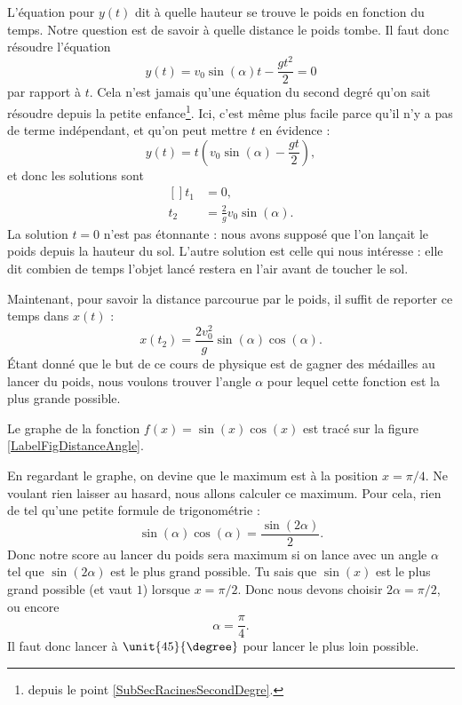 \documentclass[a4paper,12pt]{book}
\theoremstyle{mes_exemples}	\newtheorem{exemple}[numtho]{Exemple}
\theoremstyle{mes_tho}
\begin{document}
L'équation pour $y(t)$ dit à quelle hauteur se trouve le poids en fonction du temps. Notre question est de savoir à quelle distance le poids tombe. Il faut donc résoudre l'équation
\begin{equation}
	y(t)=v_0\sin(\alpha) t -\frac{ gt^2 }{ 2 }=0
\end{equation}
par rapport à $t$. Cela n'est jamais qu'une équation du second degré qu'on sait résoudre depuis la petite enfance\footnote{depuis le point \ref{SubSecRacinesSecondDegre}.}. Ici, c'est même plus facile parce qu'il n'y a pas de terme indépendant, et qu'on peut mettre $t$ en évidence :
\begin{equation}
	y(t)=t\left( v_0\sin(\alpha)-\frac{ gt }{ 2 } \right),
\end{equation}
et donc les solutions sont
\begin{equation}
	\begin{aligned}[]
		t_1&=0,\\
		t_2&=\frac{ 2 }{ g }v_0\sin(\alpha).
	\end{aligned}
\end{equation}
La solution $t=0$ n'est pas étonnante : nous avons supposé que l'on lançait le poids depuis la hauteur du sol. L'autre solution est celle qui nous intéresse : elle dit combien de temps l'objet lancé restera en l'air avant de toucher le sol.

Maintenant, pour savoir la distance parcourue par le poids, il suffit de reporter ce temps dans $x(t)$ :
\begin{equation}			\label{EqDistancePoinds}
	x(t_2)=\frac{ 2v_0^2 }{ g }\sin(\alpha)\cos(\alpha).
\end{equation}
Étant donné que le but de ce cours de physique est de gagner des médailles au lancer du poids, nous voulons trouver l'angle $\alpha$ pour lequel cette fonction est la plus grande possible.

Le graphe de la fonction $f(x)=\sin(x)\cos(x)$ est tracé sur la figure \ref{LabelFigDistanceAngle}.
\newcommand{\CaptionFigDistanceAngle}{En bleu, la fonction qui nous intéresse : $\sin(x)\cos(x)$. Pour information, en rouge se trouve la fonction $\sin(x)$}


En regardant le graphe, on devine que le maximum est à la position $x=\pi/4$. Ne voulant rien laisser au hasard, nous allons calculer ce maximum. Pour cela, rien de tel qu'une petite formule de trigonométrie :
\begin{equation}
	\sin(\alpha)\cos(\alpha)=\frac{ \sin(2\alpha) }{2}.
\end{equation}
Donc notre score au lancer du poids sera maximum si on lance avec un angle $\alpha$ tel que $\sin(2\alpha)$ est le plus grand possible. Tu sais que $\sin(x)$ est le plus grand possible (et vaut $1$) lorsque $x=\pi/2$. Donc nous devons choisir $2\alpha=\pi/2$, ou encore
\begin{equation}
	\alpha=\frac{ \pi }{ 4 }.
\end{equation}
Il faut donc lancer à $\unit{45}{\degree}$ pour lancer le plus loin possible.
\end{document}
